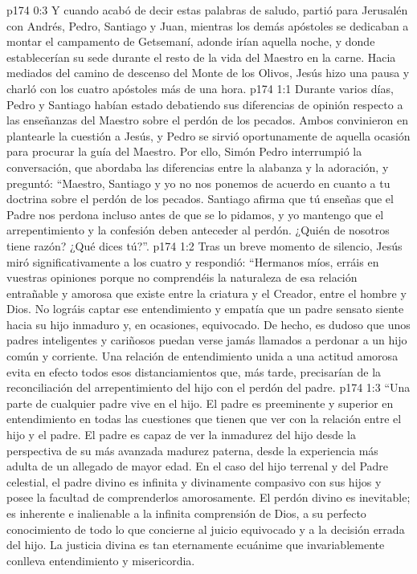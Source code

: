 \vs p174 0:3 Y cuando acabó de decir estas palabras de saludo, partió para Jerusalén con Andrés, Pedro, Santiago y Juan, mientras los demás apóstoles se dedicaban a montar el campamento de Getsemaní, adonde irían aquella noche, y donde establecerían su sede durante el resto de la vida del Maestro en la carne. Hacia mediados del camino de descenso del Monte de los Olivos, Jesús hizo una pausa y charló con los cuatro apóstoles más de una hora.
\vs p174 1:1 Durante varios días, Pedro y Santiago habían estado debatiendo sus diferencias de opinión respecto a las enseñanzas del Maestro sobre el perdón de los pecados. Ambos convinieron en plantearle la cuestión a Jesús, y Pedro se sirvió oportunamente de aquella ocasión para procurar la guía del Maestro. Por ello, Simón Pedro interrumpió la conversación, que abordaba las diferencias entre la alabanza y la adoración, y preguntó: “Maestro, Santiago y yo no nos ponemos de acuerdo en cuanto a tu doctrina sobre el perdón de los pecados. Santiago afirma que tú enseñas que el Padre nos perdona incluso antes de que se lo pidamos, y yo mantengo que el arrepentimiento y la confesión deben anteceder al perdón. ¿Quién de nosotros tiene razón? ¿Qué dices tú?”.
\vs p174 1:2 Tras un breve momento de silencio, Jesús miró significativamente a los cuatro y respondió: “Hermanos míos, erráis en vuestras opiniones porque no comprendéis la naturaleza de esa relación entrañable y amorosa que existe entre la criatura y el Creador, entre el hombre y Dios. No lográis captar ese entendimiento y empatía que un padre sensato siente hacia su hijo inmaduro y, en ocasiones, equivocado. De hecho, es dudoso que unos padres inteligentes y cariñosos puedan verse jamás llamados a perdonar a un hijo común y corriente. Una relación de entendimiento unida a una actitud amorosa evita en efecto todos esos distanciamientos que, más tarde, precisarían de la reconciliación del arrepentimiento del hijo con el perdón del padre.
\vs p174 1:3 “Una parte de cualquier padre vive en el hijo. El padre es preeminente y superior en entendimiento en todas las cuestiones que tienen que ver con la relación entre el hijo y el padre. El padre es capaz de ver la inmadurez del hijo desde la perspectiva de su más avanzada madurez paterna, desde la experiencia más adulta de un allegado de mayor edad. En el caso del hijo terrenal y del Padre celestial, el padre divino es infinita y divinamente compasivo con sus hijos y posee la facultad de comprenderlos amorosamente. El perdón divino es inevitable; es inherente e inalienable a la infinita comprensión de Dios, a su perfecto conocimiento de todo lo que concierne al juicio equivocado y a la decisión errada del hijo. La justicia divina es tan eternamente ecuánime que invariablemente conlleva entendimiento y misericordia.
